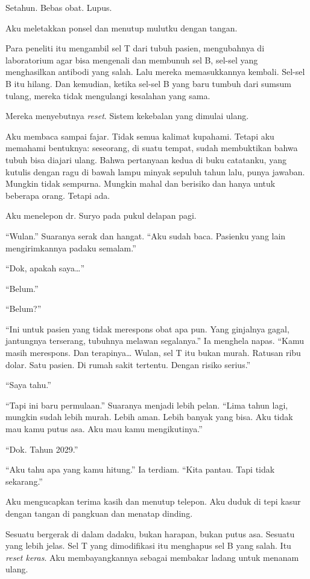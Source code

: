 \documentclass[11pt,twoside,openany]{book}
\begin{document}
Setahun. Bebas obat. Lupus.

Aku meletakkan ponsel dan menutup mulutku dengan tangan.

Para peneliti itu mengambil sel T dari tubuh pasien, mengubahnya di laboratorium agar bisa mengenali dan membunuh sel B, sel-sel yang menghasilkan antibodi yang salah. Lalu mereka memasukkannya kembali. Sel-sel B itu hilang. Dan kemudian, ketika sel-sel B yang baru tumbuh dari sumsum tulang, mereka tidak mengulangi kesalahan yang sama.

Mereka menyebutnya \emph{reset}. Sistem kekebalan yang dimulai ulang.

Aku membaca sampai fajar. Tidak semua kalimat kupahami. Tetapi aku memahami bentuknya: seseorang, di suatu tempat, sudah membuktikan bahwa tubuh bisa diajari ulang. Bahwa pertanyaan kedua di buku catatanku, yang kutulis dengan ragu di bawah lampu minyak sepuluh tahun lalu, punya jawaban. Mungkin tidak sempurna. Mungkin mahal dan berisiko dan hanya untuk beberapa orang. Tetapi ada.

Aku menelepon dr. Suryo pada pukul delapan pagi.

``Wulan.'' Suaranya serak dan hangat. ``Aku sudah baca. Pasienku yang lain mengirimkannya padaku semalam.''

``Dok, apakah saya\ldots{}''

``Belum.''

``Belum?''

``Ini untuk pasien yang tidak merespons obat apa pun. Yang ginjalnya gagal, jantungnya terserang, tubuhnya melawan segalanya.'' Ia menghela napas. ``Kamu masih merespons. Dan terapinya\ldots{} Wulan, sel T itu bukan murah. Ratusan ribu dolar. Satu pasien. Di rumah sakit tertentu. Dengan risiko serius.''

``Saya tahu.''

``Tapi ini baru permulaan.'' Suaranya menjadi lebih pelan. ``Lima tahun lagi, mungkin sudah lebih murah. Lebih aman. Lebih banyak yang bisa. Aku tidak mau kamu putus asa. Aku mau kamu mengikutinya.''

``Dok. Tahun 2029.''

``Aku tahu apa yang kamu hitung.'' Ia terdiam. ``Kita pantau. Tapi tidak sekarang.''

Aku mengucapkan terima kasih dan menutup telepon. Aku duduk di tepi kasur dengan tangan di pangkuan dan menatap dinding.

Sesuatu bergerak di dalam dadaku, bukan harapan, bukan putus asa. Sesuatu yang lebih jelas. Sel T yang dimodifikasi itu menghapus sel B yang salah. Itu \emph{reset keras}. Aku membayangkannya sebagai membakar ladang untuk menanam ulang.
\end{document}
